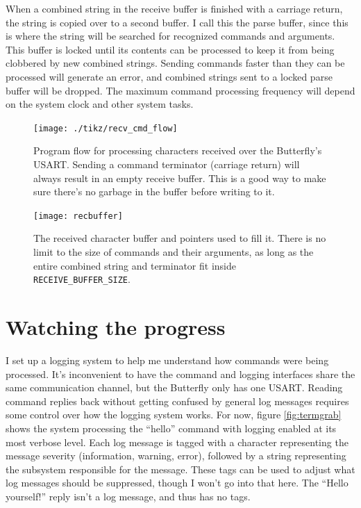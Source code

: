 When a combined string in the receive buffer is finished with a carriage return, the string is copied over to a second buffer.  I call this the parse buffer, since this is where the string will be searched for recognized commands and arguments.  This buffer is locked until its contents can be processed to keep it from being clobbered by new combined strings.  Sending commands faster than they can be processed will generate an error, and combined strings sent to a locked parse buffer will be dropped.  The maximum command processing frequency will depend on the system clock and other system tasks.  

\begin{figure}[ht]
    \begin{center}
        \texttt{[image: ./tikz/recv\_cmd\_flow]}
        \caption{Program flow for processing characters received over the Butterfly's USART.  Sending a command terminator (carriage return) will always result in an empty receive buffer.  This is a good way to make sure there's no garbage in the buffer before writing to it.\label{fig:recflow}}
    \end{center}
\end{figure}

\begin{figure}[ht]
    \begin{center}
        \texttt{[image: recbuffer]}
        \caption{The received character buffer and pointers used to fill it.  There is no limit to the size of commands and their arguments, as long as the entire combined string and terminator fit inside \texttt{RECEIVE\_BUFFER\_SIZE}.\label{fig:recbuffer}}
    \end{center}
\end{figure}

\clearpage{}
\section{Watching the progress}
I set up a logging system to help me understand how commands were being processed.  It's inconvenient to have the command and logging interfaces share the same communication channel, but the Butterfly only has one USART.  Reading command replies back without getting confused by general log messages requires some control over how the logging system works.  For now, figure \ref{fig:termgrab} shows the system processing the ``hello'' command with logging enabled at its most verbose level.  Each log message is tagged with a character representing the message severity (information, warning, error), followed by a string representing the subsystem responsible for the message.  These tags can be used to adjust what log messages should be suppressed, though I won't go into that here.  The ``Hello yourself!'' reply isn't a log message, and thus has no tags.

